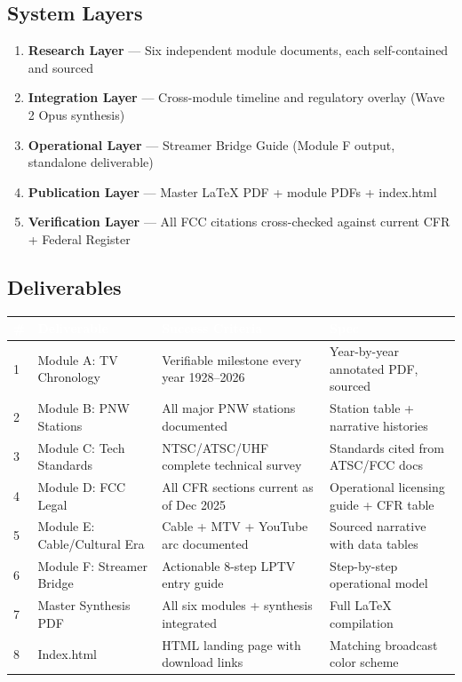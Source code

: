 \documentclass[11pt,letterpaper]{article}
\newcommand{\tableheader}[1]{\textbf{\sffamily\textcolor{white}{#1}}}
\begin{document}
\subsection{System Layers}

\begin{enumerate}
  \item \textbf{Research Layer} --- Six independent module documents, each self-contained and sourced
  \item \textbf{Integration Layer} --- Cross-module timeline and regulatory overlay (Wave 2 Opus synthesis)
  \item \textbf{Operational Layer} --- Streamer Bridge Guide (Module F output, standalone deliverable)
  \item \textbf{Publication Layer} --- Master LaTeX PDF + module PDFs + index.html
  \item \textbf{Verification Layer} --- All FCC citations cross-checked against current CFR + Federal Register
\end{enumerate}

\subsection{Deliverables}

\begin{center}
\begin{tabularx}{\textwidth}{C{0.5cm}L{3.5cm}L{4cm}X}
\toprule
{}
\tableheader{\#} & \tableheader{Deliverable} & \tableheader{Success Criteria} & \tableheader{Spec} \\
 & Module A: TV Chronology & Verifiable milestone every year 1928--2026 & Year-by-year annotated PDF, sourced \\
2 & Module B: PNW Stations & All major PNW stations documented & Station table + narrative histories \\
3 & Module C: Tech Standards & NTSC/ATSC/UHF complete technical survey & Standards cited from ATSC/FCC docs \\
4 & Module D: FCC Legal & All CFR sections current as of Dec 2025 & Operational licensing guide + CFR table \\
5 & Module E: Cable/Cultural Era & Cable + MTV + YouTube arc documented & Sourced narrative with data tables \\
6 & Module F: Streamer Bridge & Actionable 8-step LPTV entry guide & Step-by-step operational model \\
7 & Master Synthesis PDF & All six modules + synthesis integrated & Full LaTeX compilation \\
8 & Index.html & HTML landing page with download links & Matching broadcast color scheme \\
\bottomrule
\end{tabularx}
\end{center}
\end{document}
